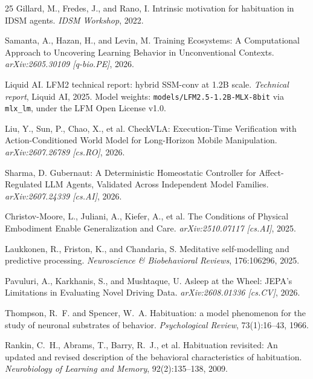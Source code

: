 \documentclass[11pt,a4paper]{article}
\begin{document}
\begin{thebibliography}{25}
 Gillard, M., Fredes, J., and Rano, I. Intrinsic motivation for habituation in IDSM agents. \textit{IDSM Workshop}, 2022.

 Samanta, A., Hazan, H., and Levin, M. Training Ecosystems: A Computational Approach to Uncovering Learning Behavior in Unconventional Contexts. \textit{arXiv:2605.30109 [q-bio.PE]}, 2026.

 Liquid AI. LFM2 technical report: hybrid SSM-conv at 1.2B scale. \textit{Technical report}, Liquid AI, 2025. Model weights: \texttt{models/LFM2.5-1.2B-MLX-8bit} via \texttt{mlx\_lm}, under the LFM Open License v1.0.

 Liu, Y., Sun, P., Chao, X., et al. CheckVLA: Execution-Time Verification with Action-Conditioned World Model for Long-Horizon Mobile Manipulation. \textit{arXiv:2607.26789 [cs.RO]}, 2026.

 Sharma, D. Gubernaut: A Deterministic Homeostatic Controller for Affect-Regulated LLM Agents, Validated Across Independent Model Families. \textit{arXiv:2607.24339 [cs.AI]}, 2026.

 Christov-Moore, L., Juliani, A., Kiefer, A., et al. The Conditions of Physical Embodiment Enable Generalization and Care. \textit{arXiv:2510.07117 [cs.AI]}, 2025.

 Laukkonen, R., Friston, K., and Chandaria, S. Meditative self-modelling and predictive processing. \textit{Neuroscience \& Biobehavioral Reviews}, 176:106296, 2025.

 Pavuluri, A., Karkhanis, S., and Mushtaque, U. Asleep at the Wheel: JEPA's Limitations in Evaluating Novel Driving Data. \textit{arXiv:2608.01336 [cs.CV]}, 2026.

 Thompson, R.~F. and Spencer, W.~A. Habituation: a model phenomenon for the study of neuronal substrates of behavior. \textit{Psychological Review}, 73(1):16--43, 1966.

 Rankin, C.~H., Abrams, T., Barry, R.~J., et al. Habituation revisited: An updated and revised description of the behavioral characteristics of habituation. \textit{Neurobiology of Learning and Memory}, 92(2):135--138, 2009.

\end{thebibliography}
\end{document}
